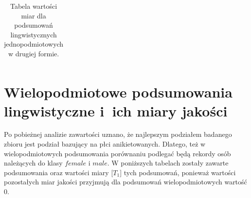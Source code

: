 \documentclass{classrep}
\begin{document}
\begin{center}
\begin{table}[H]
\begin{adjustbox}{center=11cm}
\begin{tabularx}{\textwidth}{ccccccccccccc}
  \end{tabularx}
  \end{adjustbox}
  \caption{Tabela wartości miar dla podsumowań lingwistycznych jednopodmiotowych w drugiej formie.}
\end{table}
\end{center}
 
% 
% 
\section{Wielopodmiotowe podsumowania lingwistyczne i~ich miary jakości} 

Po pobieżnej analizie zawartości uznano, że najlepszym podziałem badanego zbioru \cite{database} jest podział bazujący na płci 
anikietowanych. Dlatego, też w wielopodmiotowych podsumowania porównaniu podlegać będą rekordy osób należących do klasy \(female\) i \(male\).
W poniższych tabelach zostały zawarte podsumowania oraz wartości miary [$T_1$] tych podsumowań, ponieważ wartości pozostałych miar jakości przyjmują dla podsumowań wielopodmiotowych wartość 0.
\end{document}
